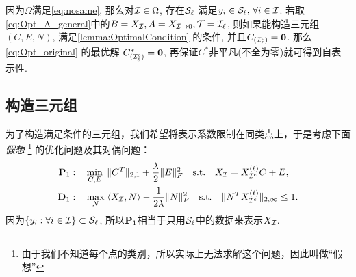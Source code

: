 因为\(\Omega\)满足\eqref{eq:nosame}, 那么对\(\mathcal{I}\in \Omega\),
存在\(\mathcal{S}_\ell\) 满足\(y_i \in \mathcal{S}_\ell, \, \forall i \in \mathcal{I}\). 
若取\eqref{eq:Opt_A_general}中的\(B=X_{\mathcal{I}}, A=X_{\mathcal{I}\rightarrow 0}, \mathcal{T}=\mathcal{I}_\ell\),
则如果能构造三元组\((C,E,N)\), 满足\autoref{lemma:OptimalCondition} 的条件,
并且\(C_{(\mathcal{I}_\ell^c)}=\mathbf{0}\). 那么\eqref{eq:Opt_original} 的最优解
\(C^*_{(\mathcal{I}_\ell^c)}=\mathbf{0}\), 再保证\(C^*\)非平凡(不全为零)就可得到自表示性.

\subsection{构造三元组}\label{sec:construct_nu}
为了构造满足条件的三元组，我们希望将表示系数限制在同类点上，于是考虑下面\emph{假想}
\footnote{由于我们不知道每个点的类别，所以实际上无法求解这个问题，因此叫做``假想''}
的优化问题及其对偶问题：
\begin{align}\label{eq:Opt_fictitious2}
  \mathbf{P}_1: \quad &\min_{C, E} \;
  \|C^T\|_{2,1}+\frac{\lambda}{2}\|E\|_F^2 \quad
  \text{s.t.} \quad X_{\mathcal{I}}=X^{(\ell)}_{\mathcal{I}^c}C+E,\\
  \mathbf{D}_1: \quad &\max_{N} \; \langle X_{\mathcal{I}}, N\rangle -
  \frac{1}{2\lambda} \|N\|_F^2 \quad
  \text{s.t.} \quad \|N^T X^{(\ell)}_{\mathcal{I}^c}\|_{2, \infty} \leq 1.
  \label{eq:dual_fictitious2}
\end{align}
因为\(\left\{y_i : \forall i \in \mathcal{I} \right\}\subset \mathcal{S}_\ell\),
所以\(\mathbf{P}_1\)相当于只用\(\mathcal{S}_\ell\)中的数据来表示\(X_{\mathcal{I}}\).

